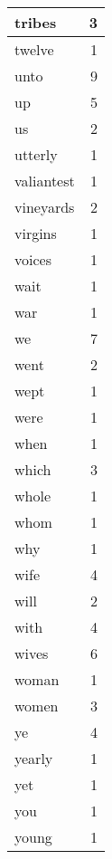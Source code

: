 \begin{center}
\begin{longtable}{l|r}
tribes & 3 \\ \hline
twelve & 1 \\ \hline
unto & 9 \\ \hline
up & 5 \\ \hline
us & 2 \\ \hline
utterly & 1 \\ \hline
valiantest & 1 \\ \hline
vineyards & 2 \\ \hline
virgins & 1 \\ \hline
voices & 1 \\ \hline
wait & 1 \\ \hline
war & 1 \\ \hline
we & 7 \\ \hline
went & 2 \\ \hline
wept & 1 \\ \hline
were & 1 \\ \hline
when & 1 \\ \hline
which & 3 \\ \hline
whole & 1 \\ \hline
whom & 1 \\ \hline
why & 1 \\ \hline
wife & 4 \\ \hline
will & 2 \\ \hline
with & 4 \\ \hline
wives & 6 \\ \hline
woman & 1 \\ \hline
women & 3 \\ \hline
ye & 4 \\ \hline
yearly & 1 \\ \hline
yet & 1 \\ \hline
you & 1 \\ \hline
young & 1 \\ \hline
\end{longtable}
\end{center}



\normalsize



